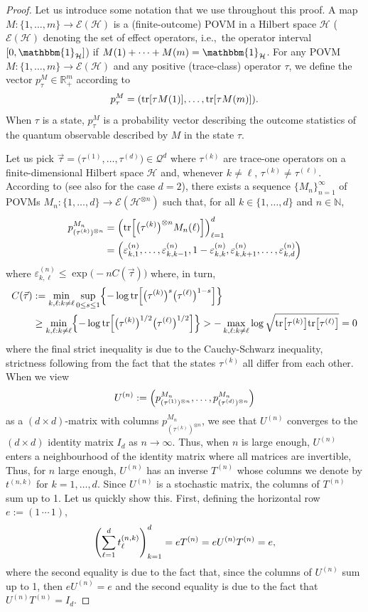 \documentclass[12pt,a4paper,reqno]{amsart}
\theoremstyle{definition}
\newcommand{\mc}[1]{\mathcal{#1}}
\newcommand{\N}{\mathbb N}
\newcommand{\R}{\mathbb R}
\newcommand{\hil}{\mathcal{H}}
\newcommand{\tr}[1]{\mathrm{tr}\left[#1\right]} %
\newcommand{\id}{\mathbbm{1}} %
\let\originalleft\left
\let\originalright\right
\renewcommand{\left}{\mathopen{}\mathclose\bgroup\originalleft}
\renewcommand{\right}{\aftergroup\egroup\originalright}
\begin{document}
\begin{proof}
Let us introduce some notation that we use throughout this proof. A map $M:\{1,\ldots,m\}\to\mc E(\hil)$ is a (finite-outcome) POVM in a Hilbert space $\hil$ ($\mc E(\hil)$ denoting the set of effect operators, i.e.,\ the operator interval $[0,\id_\hil]$) if $M(1)+\cdots+M(m)=\id_\hil$. For any POVM $M:\{1,\ldots,m\}\to\mc E(\hil)$ and any positive (trace-class) operator $\tau$, we define the vector $p^M_\tau\in\R_+^m$ according to
$$
p^M_\tau=\left(\tr{\tau M(1)},\ldots,\tr{\tau M(m)}\right).
$$
When $\tau$ is a state, $p^M_\tau$ is a probability vector describing the outcome statistics of the quantum observable described by $M$ in the state $\tau$.

Let us pick $\vec{\tau}=\big(\tau^{(1)},\ldots,\tau^{(d)}\big)\in\mc Q^d$ where $\tau^{(k)}$ are trace-one operators on a finite-dimensional Hilbert space $\hil$ and, whenever $k\neq\ell$, $\tau^{(k)}\neq\tau^{(\ell)}$. According to \cite{Li_2016} (see also \cite{Nussbaum_Szkola_2009} for the case $d=2$), there exists a sequence $\{M_n\}_{n=1}^\infty$ of POVMs $M_n:\{1,\ldots,d\}\to\mc E(\hil^{\otimes n})$ such that, for all $k\in\{1,\ldots,d\}$ and $n\in\N$,
\begin{align*}
p^{M_n}_{(\tau^{(k)})^{\otimes n}}&=\left(\tr{\big(\tau^{(k)}\big)^{\otimes n}M_n(\ell)}\right)_{\ell=1}^d\\
&=\left(\varepsilon_{k,1}^{(n)},\ldots,\varepsilon_{k,k-1}^{(n)},1-\varepsilon_{k,k}^{(n)},\varepsilon_{k,k+1}^{(n)},\ldots,\varepsilon_{k,d}^{(n)}\right)
\end{align*}
where $\varepsilon_{k,\ell}^{(n)}\leq\exp{\big(-nC(\vec{\tau})\big)}$ where, in turn,
\begin{align*}
C(\vec{\tau})&:=\min_{k,\ell:k\neq\ell}\sup_{0\leq s\leq 1}\left\{-\log{\tr{\big(\tau^{(k)}\big)^s\big(\tau^{(\ell)}\big)^{1-s}}}\right\}\\
&\geq\min_{k,\ell:k\neq\ell}\left\{-\log{\tr{\big(\tau^{(k)}\big)^{1/2}\big(\tau^{(\ell)}\big)^{1/2}}}\right\}>-\max_{k,\ell:k\neq\ell}\log{\sqrt{\tr{\tau^{(k)}}\tr{\tau^{(\ell)}}}}=0
\end{align*}
where the final strict inequality is due to the Cauchy-Schwarz inequality, strictness following from the fact that the states $\tau^{(k)}$ all differ from each other. When we view
$$
U^{(n)}:=\left(p^{M_n}_{(\tau^{(1)})^{\otimes n}},\ldots,p^{M_n}_{(\tau^{(d)})^{\otimes n}}\right)
$$
as a $(d\times d)$-matrix with columns $p^{M_n}_{(\tau^{(k)})^{\otimes n}}$, we see that $U^{(n)}$ converges to the $(d\times d)$ identity matrix $I_d$ as $n\to\infty$. Thus, when $n$ is large enough, $U^{(n)}$ enters a neighbourhood of the identity matrix where all matrices are invertible, Thus, for $n$ large enough, $U^{(n)}$ has an inverse $T^{(n)}$ whose columns we denote by $t^{(n,k)}$ for $k=1,\ldots,d$. Since $U^{(n)}$ is a stochastic matrix, the columns of $T^{(n)}$ sum up to 1. Let us quickly show this. First, defining the horizontal row $e:=(1\,\cdots\,1)$,
$$
\left(\sum_{\ell=1}^d t^{(n,k)}_\ell\right)_{k=1}^d=eT^{(n)}=eU^{(n)}T^{(n)}=e,
$$
where the second equality is due to the fact that, since the columns of $U^{(n)}$ sum up to 1, then $eU^{(n)}=e$ and the second equality is due to the fact that $U^{(n)}T^{(n)}=I_d$.


\end{proof}
\end{document}
